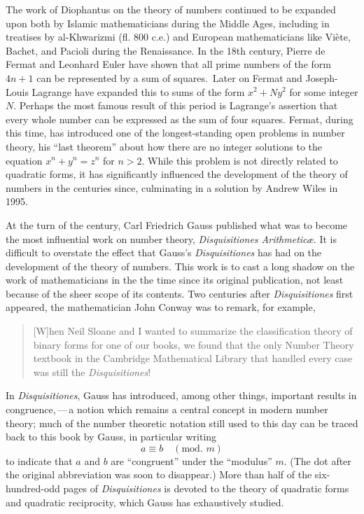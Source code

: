 The work of Diophantus on the theory of numbers continued to be expanded upon both by Islamic mathematicians during the Middle Ages, including in treatises by al-Khwarizmi (fl. 800 {\sc c.e.}) and European mathematicians like Vi\`ete, Bachet, and Pacioli during the Renaissance. In the 18th century, Pierre de Fermat and Leonhard Euler have shown that all prime numbers of the form \(4n + 1\) can be represented by a sum of squares.\,\cite{hahn2008quadratic} Later on Fermat and Joseph-Louis Lagrange have expanded this to sums of the form \(x^2 + Ny^2\) for some integer \(N\). Perhaps the most famous result of this period is Lagrange's assertion that every whole number can be expressed as the sum of four squares. Fermat, during this time, has introduced one of the longest-standing open problems in number theory, his ``last theorem'' about how there are no integer solutions to the equation \(x^n + y^n = z^n\) for \(n > 2\). While this problem is not directly related to quadratic forms, it has significantly influenced the development of the theory of numbers in the centuries since, culminating in a solution by Andrew Wiles in 1995. \cite{wiles1995modular}

At the turn of the century, Carl Friedrich Gauss published what was to become the most influential work on number theory, \emph{Disquisitiones Arithmetic\ae}. It is difficult to overstate the effect that Gauss’s \emph{Disquisitiones} has had on the development of the theory of numbers. This work is to cast a long shadow on the work of mathematicians in the the time since its original publication, not least because of the sheer scope of its contents. Two centuries after \emph{Disquisitiones} first appeared, the mathematician John Conway was to remark, for example,
\begin{quote}
    [W]hen Neil Sloane and I wanted to summarize the classification theory of binary forms for one of our books, we found that the only Number Theory textbook in the Cambridge Mathematical Library that handled every case was still the \emph{Disquisitiones}! \cite{conway1999universal} 
\end{quote}
In \emph{Disquisitiones}, Gauss has introduced, among other things, important results in congruence,\,---\,a notion which remains a central concept in modern number theory; much of the number theoretic notation still used to this day can be traced back to this book by Gauss, in particular writing
\[
    a \equiv b \quad (\text{mod. } m)
\]
to indicate that \(a\) and \(b\) are ``congruent'' under the  ``modulus'' \(m\). (The dot after the original abbreviation was soon to disappear.) More than half of the six-hundred-odd pages of \emph{Disquisitiones} is devoted to the theory of quadratic forms and quadratic reciprocity, which Gauss has exhaustively studied. 

